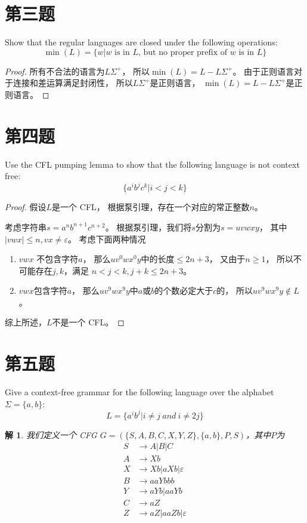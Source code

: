 \documentclass[12pt,onecolumn]{article}
\newtheorem*{proof}{证明}
\theoremstyle{plain}
\newtheorem*{solution}{解}
\begin{document}
\section{第三题}
Show that the regular languages are closed under the following operations:
\[
 \min(L) = \{ w | w \text{ is in $L$, but no proper prefix of $w$ is in } L \}
\]

\begin{proof}
 所有不合法的语言为$L\Sigma^+$，
 所以$\min(L) = L - L\Sigma^+$。
 由于正则语言对于连接和差运算满足封闭性，
 所以$L\Sigma^+$是正则语言，
 $\min(L) = L - L\Sigma^+$是正则语言。
\end{proof}

\section{第四题}
Use the CFL pumping lemma to show that the following language is not context free:
\[
 \{ a^i b^j c^k | i < j < k \}
\]

\begin{proof}
 假设$L$是一个 CFL，
 根据泵引理，存在一个对应的常正整数$n$。

 考虑字符串$s = a^{n}b^{n + 1}c^{n + 2}$。
 根据泵引理，我们将$s$分割为$s = uvwxy$，
 其中$|vwx| \le n, vx \neq \varepsilon$。
 考虑下面两种情况
 \begin{enumerate}[fullwidth,itemindent=\parindent,label=(\arabic*)]
 \item
 $vwx$ 不包含字符$a$，
 那么$uv^0wx^0y$中的长度$ \le 2n + 3$，
 又由于$n \ge 1$，
 所以不可能存在$j, k$，满足
 $n < j < k, j + k \le 2n + 3$。
 \item
 $vwx$包含字符$a$，
 那么$uv^9wx^9y$中$a$或$b$的个数必定大于$c$的，
 所以$uv^9wx^9y \notin L$。
 \end{enumerate}

 综上所述，$L$不是一个 CFL。
\end{proof}

\section{第五题}
Give a context-free grammar for the following language over
the alphabet $ \Sigma = \{a, b\}$:
\[
 L = \{a^i b^j | i \neq j~and~i \neq 2j \}
\]

\begin{solution}
 我们定义一个 CFG $G = (\{S, A, B, C, X, Y, Z\}, \{a, b\}, P, S)$，其中$P$为
 \begin{align*}
 S & \to A | B | C               \\
 A & \to Xb                      \\
 X & \to Xb | aXb | \varepsilon  \\
 B & \to aaYbbb                  \\
 Y & \to aYb | aaYb              \\
 C & \to aZ                      \\
 Z & \to aZ | aaZb | \varepsilon
 \end{align*}
\end{solution}
\end{document}
